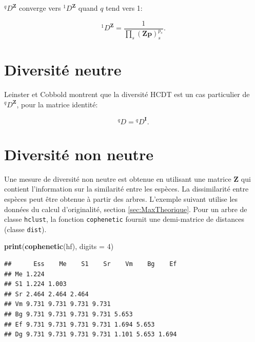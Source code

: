 \documentclass[
  11pt,
  french,
  a4paper,
  extrafontsizes,onecolumn,openright
  ]{memoir}
\newenvironment{Shaded}{\begin{snugshade}}{\end{snugshade}}
\newcommand{\DataTypeTok}[1]{\textcolor[rgb]{0.13,0.29,0.53}{#1}}
\newcommand{\DecValTok}[1]{\textcolor[rgb]{0.00,0.00,0.81}{#1}}
\newcommand{\KeywordTok}[1]{\textcolor[rgb]{0.13,0.29,0.53}{\textbf{#1}}}
\newcommand{\NormalTok}[1]{#1}
\begin{document}
\(^q\!D^{\mathbf{Z}}\) converge vers \(^1\!D^{\mathbf{Z}}\) quand \(q\) tend vers 1:

\begin{equation}
  \label{eq:D1z}
  ^1\!D^{\mathbf{Z}} = \frac{1}{\prod_s{{\left(\mathbf{Zp}\right)}^{p_s}_s}}.
\end{equation}

\hypertarget{diversituxe9-neutre}{%
\section{Diversité neutre}\label{diversituxe9-neutre}}

Leinster et Cobbold montrent que la diversité HCDT est un cas particulier de \(^q\!D^{\mathbf{Z}}\), pour la matrice identité:

\begin{equation}
  \label{eq:DqI}
  ^{q}\!D={^q\!D^{\mathbf{I}}}.
\end{equation}

\hypertarget{diversituxe9-non-neutre}{%
\section{Diversité non neutre}\label{diversituxe9-non-neutre}}

Une mesure de diversité non neutre est obtenue en utilisant une matrice \(\mathbf{Z}\) qui contient l'information sur la similarité entre les espèces.
La dissimilarité entre espèces peut être obtenue à partir des arbres.
L'exemple suivant utilise les données du calcul d'originalité, section \ref{sec:MaxTheorique}.
Pour un arbre de classe \texttt{hclust}, la fonction \texttt{cophenetic} fournit une demi-matrice de distances (classe \texttt{dist}).

\scriptsize

\begin{Shaded}
\begin{Highlighting}[]
\KeywordTok{print}\NormalTok{(}\KeywordTok{cophenetic}\NormalTok{(hf), }\DataTypeTok{digits =} \DecValTok{4}\NormalTok{)}
\end{Highlighting}
\end{Shaded}

\begin{verbatim}
##      Ess    Me    S1    Sr    Vm    Bg    Ef
## Me 1.224                                    
## S1 1.224 1.003                              
## Sr 2.464 2.464 2.464                        
## Vm 9.731 9.731 9.731 9.731                  
## Bg 9.731 9.731 9.731 9.731 5.653            
## Ef 9.731 9.731 9.731 9.731 1.694 5.653      
## Dg 9.731 9.731 9.731 9.731 1.101 5.653 1.694
\end{verbatim}
\end{document}
